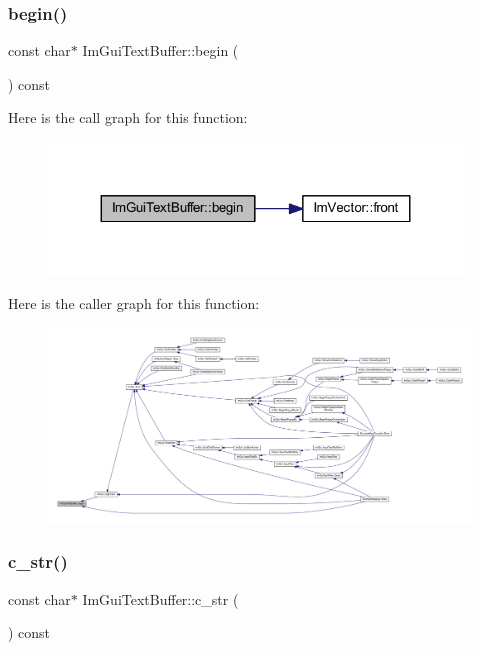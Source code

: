 \subsubsection{\texorpdfstring{begin()}{begin()}}
{\footnotesize\ttfamily const char$\ast$ Im\+Gui\+Text\+Buffer\+::begin (\begin{DoxyParamCaption}{ }\end{DoxyParamCaption}) const\hspace{0.3cm}{\ttfamily [inline]}}

Here is the call graph for this function\+:
\nopagebreak
\begin{figure}[H]
\begin{center}
\leavevmode
\includegraphics[width=311pt]{struct_im_gui_text_buffer_aab6d83c6b9a8061287a4cb6135c1cab4_cgraph}
\end{center}
\end{figure}
Here is the caller graph for this function\+:
\nopagebreak
\begin{figure}[H]
\begin{center}
\leavevmode
\includegraphics[width=350pt]{struct_im_gui_text_buffer_aab6d83c6b9a8061287a4cb6135c1cab4_icgraph}
\end{center}
\end{figure}
\mbox{\label{struct_im_gui_text_buffer_afb03439bc91723e274bfb9d247a691b9}} 
\subsubsection{\texorpdfstring{c\+\_\+str()}{c\_str()}}
{\footnotesize\ttfamily const char$\ast$ Im\+Gui\+Text\+Buffer\+::c\+\_\+str (\begin{DoxyParamCaption}{ }\end{DoxyParamCaption}) const\hspace{0.3cm}{\ttfamily [inline]}}

